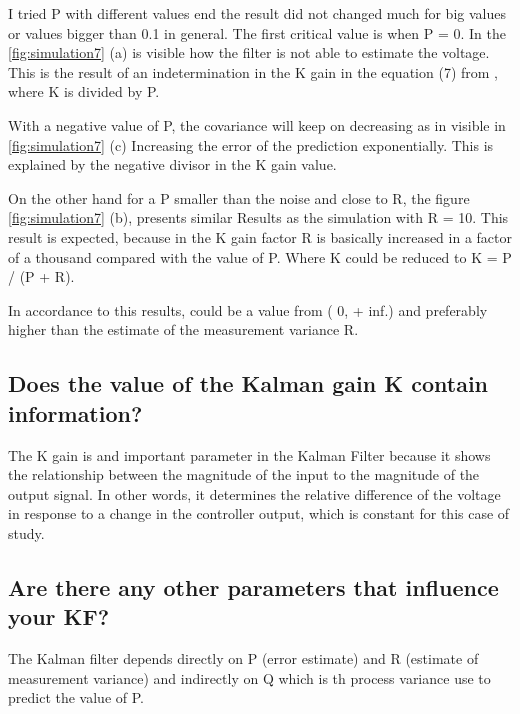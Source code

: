 \documentclass{article}
\begin{document}
    I tried P with different values end the result did not changed much for big values or values bigger than 0.1 in general.
    The first critical value is when P = 0. In the \ref{fig:simulation7} (a) is visible how the filter is not able to estimate the
    voltage. This is the result of an indetermination in the K gain in the equation (7) from \cite{LabManual},
    where K is divided by P. 

    With a negative value of P, the covariance will keep on decreasing as  in visible in \ref{fig:simulation7} (c)
    Increasing the error of the prediction exponentially. This is explained by the negative divisor in the K gain value.
    
    On the other hand for a P smaller than the noise and close to R, the figure \ref{fig:simulation7} (b),
    presents similar Results as the simulation with R = 10. This result is expected, because in the K gain factor R is 
    basically increased in a factor of a thousand compared with the value of P. Where K could be reduced to 
    K = P / (P + R).

    In accordance to this results, could be a value from ( 0, + inf.) and preferably higher than the estimate of
    the measurement variance R.
    

    \subsection{Does the value of the Kalman gain K contain information?}

    The K gain is and important parameter in the Kalman Filter because it shows the relationship
    between the magnitude of the input to the magnitude of the output signal. In other words, it determines
    the relative difference of the voltage in response to a change in the controller output, which is constant 
    for this case of study.

    \subsection{Are there any other parameters that influence your KF?}

    The Kalman filter depends directly on P (error estimate) and R (estimate of measurement variance) and indirectly
    on Q which is th process variance use to predict the value of P.

    
    
    \nocite{*}
\end{document}
